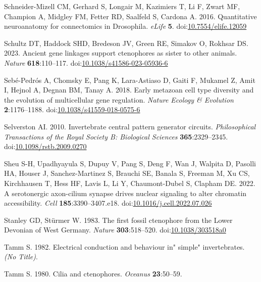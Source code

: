 \documentclass[
  11pt,
]{article}
\newlength{\cslhangindent}
\newenvironment{CSLReferences}[2] %
 {\begin{list}{}{%
  \setlength{\itemindent}{0pt}
  \setlength{\leftmargin}{0pt}
  \setlength{\parsep}{0pt}
  \ifodd #1
   \setlength{\leftmargin}{\cslhangindent}
   \setlength{\itemindent}{-1\cslhangindent}
  \fi
  \setlength{\itemsep}{#2\baselineskip}}}
 {\end{list}}
\begin{document}
\begin{CSLReferences}{1}{0}
Schneider-Mizell CM, Gerhard S, Longair M, Kazimiers T, Li F, Zwart MF,
Champion A, Midgley FM, Fetter RD, Saalfeld S, Cardona A. 2016.
Quantitative neuroanatomy for connectomics in Drosophila. \emph{eLife}
\textbf{5}.
doi:\href{https://doi.org/10.7554/elife.12059}{10.7554/elife.12059}

Schultz DT, Haddock SHD, Bredeson JV, Green RE, Simakov O, Rokhsar DS.
2023. Ancient gene linkages support ctenophores as sister to other
animals. \emph{Nature} \textbf{618}:110--117.
doi:\href{https://doi.org/10.1038/s41586-023-05936-6}{10.1038/s41586-023-05936-6}

Sebé-Pedrós A, Chomsky E, Pang K, Lara-Astiaso D, Gaiti F, Mukamel Z,
Amit I, Hejnol A, Degnan BM, Tanay A. 2018. Early metazoan cell type
diversity and the evolution of multicellular gene regulation.
\emph{Nature Ecology \& Evolution} \textbf{2}:1176--1188.
doi:\href{https://doi.org/10.1038/s41559-018-0575-6}{10.1038/s41559-018-0575-6}

Selverston AI. 2010. Invertebrate central pattern generator circuits.
\emph{Philosophical Transactions of the Royal Society B: Biological
Sciences} \textbf{365}:2329--2345.
doi:\href{https://doi.org/10.1098/rstb.2009.0270}{10.1098/rstb.2009.0270}

Sheu S-H, Upadhyayula S, Dupuy V, Pang S, Deng F, Wan J, Walpita D,
Pasolli HA, Houser J, Sanchez-Martinez S, Brauchi SE, Banala S, Freeman
M, Xu CS, Kirchhausen T, Hess HF, Lavis L, Li Y, Chaumont-Dubel S,
Clapham DE. 2022. A serotonergic axon-cilium synapse drives nuclear
signaling to alter chromatin accessibility. \emph{Cell}
\textbf{185}:3390--3407.e18.
doi:\href{https://doi.org/10.1016/j.cell.2022.07.026}{10.1016/j.cell.2022.07.026}

Stanley GD, Stürmer W. 1983. The first fossil ctenophore from the Lower
Devonian of West Germany. \emph{Nature} \textbf{303}:518--520.
doi:\href{https://doi.org/10.1038/303518a0}{10.1038/303518a0}

Tamm S. 1982. Electrical conduction and behaviour in" simple"
invertebrates. \emph{(No Title)}.

Tamm S. 1980. Cilia and ctenophores. \emph{Oceanus} \textbf{23}:50--59.


\end{CSLReferences}
\end{document}
